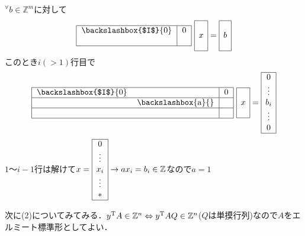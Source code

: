 ${}^{\forall}b\in{\mathbb{Z}}^m$に対して
\begin{equation}
  \begin{tabular}{|c|c|}
    \hline
    \backslashbox{$I$}{0}&0\\
    &\\\hline
  \end{tabular}\
  \begin{array}{|c|}
    \hline
    \\
    x\\
    \\\hline
  \end{array}=
  \begin{array}{|c|}
    \hline
    \\
    b\\
    \\\hline
  \end{array}
\end{equation}
このとき$i(>1)$行目で
\begin{equation}
  \begin{tabular}{|cc|c|}
    \hline
    \backslashbox{$I$}{0}&&0\\\hline
    &\backslashbox{a}{}&\\\hline
    &&\\\hline
  \end{tabular}\
  \begin{array}{|c|}
    \hline
    \\
    x\\
    \\\hline
  \end{array}=
  \begin{array}{|c|}
    \hline
    0\\
    \vdots\\
    b_i\\
    \vdots\\
    0
    \\\hline
  \end{array}
\end{equation}
$1～i-1$行は解けて$x=
\begin{array}{|c|}
  \hline
  0\\
  \vdots\\
  x_i\\
  \vdots\\
  \ast
  \\\hline
\end{array}\to ax_i =b_i \in\mathbb{Z}$なので$a=1$

次に(2)についてみてみる．${y}^{\mathrm{T}}A\in{\mathbb{Z}}^n \Leftrightarrow{y}^{\mathrm{T}}AQ\in{\mathbb{Z}}^n$($Q$は単摸行列)なので$A$をエルミート標準形としてよい．

